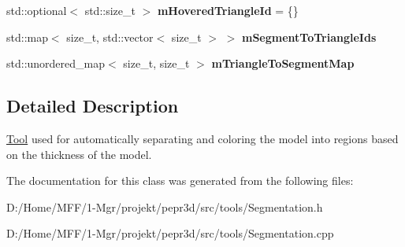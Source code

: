 \begin{DoxyCompactItemize}
\item 
\mbox{\label{classpepr3d_1_1_segmentation_a6a213a470006808d715976b1d3ecf6de}} 
std\+::optional$<$ std\+::size\+\_\+t $>$ {\bfseries m\+Hovered\+Triangle\+Id} = \{\}
\item 
\mbox{\label{classpepr3d_1_1_segmentation_ad3344f323ffce78be2eaf73fca05be96}} 
std\+::map$<$ size\+\_\+t, std\+::vector$<$ size\+\_\+t $>$ $>$ {\bfseries m\+Segment\+To\+Triangle\+Ids}
\item 
\mbox{\label{classpepr3d_1_1_segmentation_a3282ce65f09dbdf09eac1e83bec117d6}} 
std\+::unordered\+\_\+map$<$ size\+\_\+t, size\+\_\+t $>$ {\bfseries m\+Triangle\+To\+Segment\+Map}
\end{DoxyCompactItemize}


\subsection{Detailed Description}
\mbox{\hyperlink{classpepr3d_1_1_tool}{Tool}} used for automatically separating and coloring the model into regions based on the thickness of the model. 

The documentation for this class was generated from the following files\+:\begin{DoxyCompactItemize}
\item 
D\+:/\+Home/\+M\+F\+F/1-\/\+Mgr/projekt/pepr3d/src/tools/Segmentation.\+h\item 
D\+:/\+Home/\+M\+F\+F/1-\/\+Mgr/projekt/pepr3d/src/tools/Segmentation.\+cpp\end{DoxyCompactItemize}
